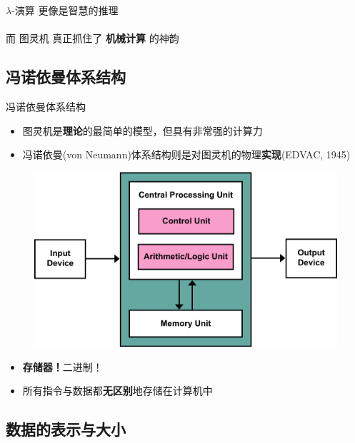 \documentclass[UTF8]{ctexbeamer}
\begin{document}
\begin{frame}
\begin{center}
$\lambda$-演算 更像是智慧的推理\\
\quad\\
而 图灵机 真正抓住了 {\Large\textbf{机械计算}} 的神韵
\end{center}
\end{frame}

\subsection{冯诺依曼体系结构}
\begin{frame}
\subsectionpage
\end{frame}


\begin{frame}{冯诺依曼体系结构}
\begin{itemize}
	\item 图灵机是\textbf{理论}的最简单的模型，但具有非常强的计算力
	\item 冯诺依曼(von Neumann)体系结构则是对图灵机的物理\textbf{实现}(EDVAC, 1945)
\end{itemize}
\begin{figure}
\centering
\includegraphics[width=0.5\linewidth]{fig/Lecture2/Von_Neumann_Architecture.png}
\end{figure}
\begin{itemize}[<+->]
	\item \textbf{存储器！}二进制！
	\item 所有指令与数据都\textbf{无区别}地存储在计算机中
\end{itemize}
\end{frame}

\subsection{数据的表示与大小}
\begin{frame}
\subsectionpage
\end{frame}
\end{document}
